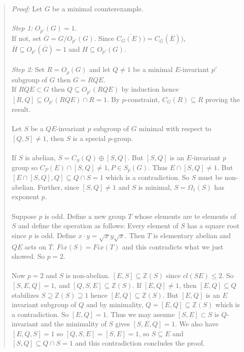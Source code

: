 \begin{quote}
\emph{Proof:}  
Let $G$ be a minimal counterexample.
\\
\\
\emph{Step 1:} $O_{p'}(G)= 1$.
\\
If not, set ${\overline G}= G/O_{p'}(G)$.  Since 
${\overline {C_G(E))}}= C_{\overline G}({\overline E}))$, ${\overline H} \subseteq O_{p'}({\overline G})=1$ and
$H \subseteq O_{p'}(G)$.
\\
\\
\emph{Step 2:} Set $R= O_p(G)$ and let $Q \ne 1$ be a minimal $E$-invariant $p'$ subgroup 
of $G$ then $G= RQE$.
\\
If $RQE \subset G$ then $Q \subseteq O_{p'}(RQE)$ by induction hence
$[R, Q] \subseteq O_{p'}(RQE) \cap R = 1$.  By $p$-constraint, $C_G(R) \subseteq R$ proving the
result.
\\
\\
Let $S$ be a $QE$-invariant $p$ subgroup of $G$ minimal with respect to $[Q, S] \ne 1$, then
$S$ is a special $p$-group.
\\
\\
If $S$ is abelian, $S= C_S(Q) \oplus [S, Q]$.  But $[S, Q]$ is an $E$-invariant $p$ group so
$C_P(E) \cap [S,Q] \ne 1, P \in S_p(G)$.  Thus $E \cap [S,Q] \ne 1$.  But
$[E \cap [S,Q], Q] \subseteq Q \cap S = 1$ which is a contradiction.  So $S$ must be non-abelian.
Further, since $[S, Q] \ne 1$ and $S$ is minimal, $S= \Omega_1(S)$ has exponent $p$.
\\
\\
Suppose $p$ is odd.
Define a new group $T$ whose elements are te elements of $S$ and define the operation as follows:
Every element of $S$ has a square root since $p$ is odd.  
Define $x \cdot y = {\sqrt x} y {\sqrt x}$.  Then $T$ is elementary abelian and $QE$ acts
on $T$.  $Fix(S)=Fix(T)$ and this contradicts what we just showed. So $p=2$.
\\
\\
Now $p=2$ and $S$ is non-abelian.  $[E,S] \subseteq  {\mathbb Z}(S)$ since $cl(SE) \le 2$.  So
$[S,E,Q] = 1$, and 
$[Q, S,E] \subseteq {\mathbb Z}(S)$.
If $[E, Q] \ne 1$, then
$[E, Q] \subseteq Q$ stabilizes $S \supseteq {\mathbb Z}(S) \supseteq 1$ hence
$[E, Q] \subseteq {\mathbb Z}(S)$. But 
$[E,Q]$ is an $E$ invariant subgroup of $Q$ and by minimality, $Q= [E,Q] \subseteq {\mathbb Z}(S)$
which is a contradiction.  So $[E, Q] =1$.
Thus we may assume $[S, E] \subset S$ is $Q$-invariant and the minimality of $S$ gives
$[S,E,Q]= 1$.  We also have $[E,Q,S]=1$ so $[Q,S,E]=[S,E]=1$, so $S \subseteq E$ and
$[S,Q] \subseteq Q \cap S =1$ and this contradiction concludes the proof.
\end{quote}
